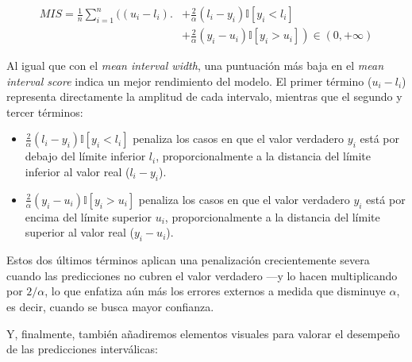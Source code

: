 \begin{itemize}
    \begin{align*} 
    MIS = \frac{1}{n} \sum_{i=1}^n
    \biggl( (u_i-l_i) \biggr.&+ \frac{2}{\alpha} \left( l_i-y_i \right) \mathbb{I}\left[ y_i<l_i \right] \\
    &+\left. \frac{2}{\alpha}  \left( y_i-u_i \right) \mathbb{I}\left[ y_i>u_i \right] \right)
    \in \left( 0, +\infty \right)
    \end{align*}

    Al igual que con el \textit{mean interval width}, una puntuación más baja en el \textit{mean interval score} indica un mejor rendimiento del modelo. El primer término ($u_i-l_i$) representa directamente la amplitud de cada intervalo, mientras que el segundo y tercer términos:

    \begin{itemize}
        \item $\frac{2}{\alpha} \left( l_i-y_i \right) \mathbb{I}\left[ y_i<l_i \right]$ penaliza los casos en que el valor verdadero $y_i$ está por debajo del límite inferior $l_i$, proporcionalmente a la distancia del límite inferior al valor real ($l_i-y_i$).
        \item $\frac{2}{\alpha}  \left( y_i-u_i \right) \mathbb{I}\left[ y_i>u_i \right]$ penaliza los casos en que el valor verdadero $y_i$ está por encima del límite superior $u_i$, proporcionalmente a la distancia del límite superior al valor real ($y_i-u_i$).
    \end{itemize}

    Estos dos últimos términos aplican una penalización crecientemente severa cuando las predicciones no cubren el valor verdadero ---y lo hacen multiplicando por $2/\alpha$, lo que enfatiza aún más los errores externos a medida que disminuye $\alpha$, es decir, cuando se busca mayor confianza.

\end{itemize}

Y, finalmente, también añadiremos elementos visuales para valorar el desempeño de las predicciones interválicas:

